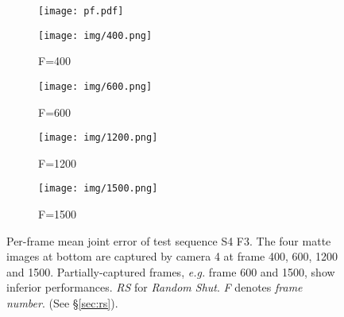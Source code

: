\documentclass[10pt,twocolumn,letterpaper]{article}
\begin{document}
\begin{figure}
\begin{center}
\centering
    \begin{subfigure}[b]{\linewidth}
    \centering
        \texttt{[image: pf.pdf]}
    \end{subfigure}
    \begin{subfigure}[b]{0.1\textwidth}
    \centering
        \texttt{[image: img/400.png]}
        \captionsetup{labelformat=empty}
        \caption{F=400}
    \end{subfigure}
     \begin{subfigure}[b]{0.1\textwidth}
    \centering
        \texttt{[image: img/600.png]}
        \captionsetup{labelformat=empty}
        \caption{F=600}
    \end{subfigure}
    \begin{subfigure}[b]{0.1\textwidth}
    \centering
        \texttt{[image: img/1200.png]}
        \captionsetup{labelformat=empty}
        \caption{F=1200}
    \end{subfigure}
    \begin{subfigure}[b]{0.1\textwidth}
    \centering
        \texttt{[image: img/1500.png]}
        \captionsetup{labelformat=empty}
        \caption{F=1500}
    \end{subfigure}
\end{center}
    \vspace{-0.5cm}
   \caption{Per-frame mean joint error of test sequence S4 F3. The four matte images at bottom are captured by camera 4 at frame 400, 600, 1200 and 1500. Partially-captured frames, \textit{e.g.} frame 600 and 1500, show inferior performances. \textit{RS} for \textit{Random Shut}. \textit{F} denotes \textit{frame number}. (See \S\ref{sec:rs}).}
\label{fig:rs}
\vspace*{-14pt}
\end{figure}

\vspace*{-4pt}
\end{document}
